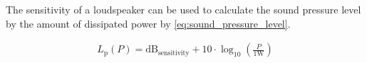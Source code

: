 The sensitivity of a loudspeaker can be used to calculate the sound pressure level by the amount of dissipated power by \autoref{eq:sound_pressure_level}.

\begin{align}\label{eq:sound_pressure_level}
L_\text{p}(P)=\text{dB}_\text{sensitivity} + 10\cdot \log_{10} \left(\frac{P}{1 \text{W}}\right)
\end{align} 









